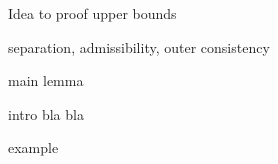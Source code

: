 \documentclass[t,nototalpages,useheader=false]{tudbeamer}
\begin{document}
\begin{frame}
  Idea to proof upper bounds

  separation, admissibility, outer consistency
\end{frame}

\begin{frame}
  main lemma
\end{frame}


\begin{frame}
  intro bla bla
\end{frame}

\begin{frame}
  example
\end{frame}













\end{document}
